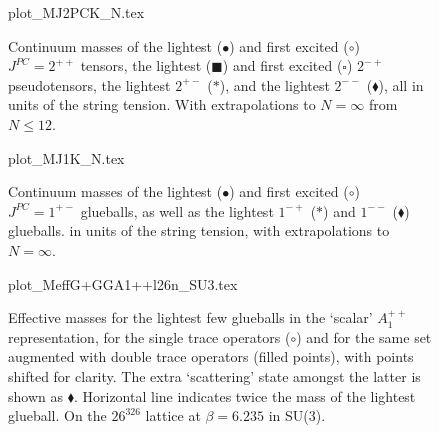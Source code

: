 \documentclass[12pt]{article}
\begin{document}
\begin{figure}[htb]
\begin	{center}
\leavevmode
	{plot_MJ2PCK_N.tex}
\end	{center}
\caption{Continuum masses of the lightest ($\bullet$) and first excited ($\circ$)
  $J^{PC}=2^{++}$ tensors, the lightest ($\blacksquare$) and first excited ($\square$)
  $2^{-+}$ pseudotensors, the lightest $2^{+-}$ ($\ast$), and the lightest
  $2^{--}$ ($\blacklozenge$), all in units of the string tension.
  With extrapolations to $N=\infty$ from $N\leq 12$.}
\label{fig_MJ2PCK_N}
\end{figure}

\begin{figure}[htb]
\begin	{center}
\leavevmode
	{plot_MJ1K_N.tex}
\end	{center}
\caption{Continuum masses of the lightest ($\bullet$) and first excited ($\circ$) $J^{PC}=1^{+-}$
  glueballs, as well as the lightest $1^{-+}$ ($\ast$) and $1^{--}$ ($\blacklozenge$)
  glueballs. in units of the string tension, with extrapolations to $N=\infty$.}
\label{fig_MJ1K_N}
\end{figure}




\begin{figure}[htb]
\begin	{center}
\leavevmode
	{plot_MeffG+GGA1++l26n_SU3.tex}
\end	{center}
\caption{Effective masses for the lightest few glueballs in the `scalar' $A_1^{++}$
  representation, for the single trace operators ($\circ$) and for the same set
  augmented with double trace operators (filled points), with points shifted for clarity.
  The extra `scattering' state amongst the latter is shown as $\blacklozenge$. 
  Horizontal line indicates twice the mass of the lightest glueball.
  On the $26^326$ lattice at $\beta=6.235$ in SU(3).}
\label{fig_MeffG+GGA1++l26n_SU3}
\end{figure}
\end{document}

